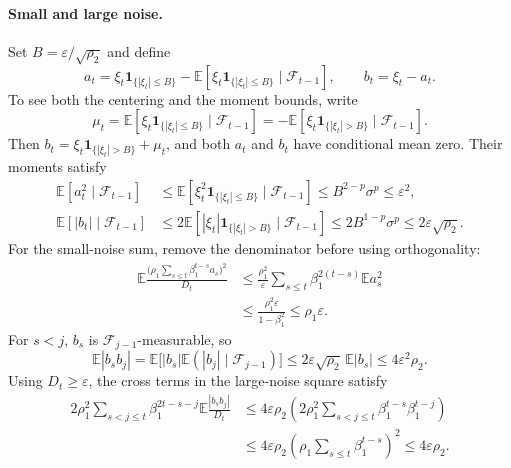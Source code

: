 \documentclass[11pt,letterpaper]{article}
\theoremstyle{definition}
\newcommand{\E}{\mathbb E}
\newcommand{\F}{\mathcal F}
\newcommand{\eps}{\varepsilon}
\begin{document}
\paragraph{Small and large noise.}
Set $B=\eps/\sqrt{\rho_2}$ and define
\[
a_t=\xi_t\mathbf1_{\{|\xi_t|\le B\}}
-\E[\xi_t\mathbf1_{\{|\xi_t|\le B\}}\mid\F_{t-1}],
\qquad b_t=\xi_t-a_t.
\]
To see both the centering and the moment bounds, write
\[
\mu_t=\E[\xi_t\mathbf1_{\{|\xi_t|\le B\}}\mid\F_{t-1}]
=-\E[\xi_t\mathbf1_{\{|\xi_t|>B\}}\mid\F_{t-1}].
\]
Then $b_t=\xi_t\mathbf1_{\{|\xi_t|>B\}}+\mu_t$, and both
$a_t$ and $b_t$ have conditional mean zero. Their moments satisfy
\begin{align}
\E[a_t^2\mid\F_{t-1}]
&\le\E[\xi_t^2\mathbf1_{\{|\xi_t|\le B\}}\mid\F_{t-1}]
\le B^{2-p}\sigma^p\le\eps^2,\nonumber\\
\E[|b_t|\mid\F_{t-1}]
&\le2\E[|\xi_t|\mathbf1_{\{|\xi_t|>B\}}\mid\F_{t-1}]
\le2B^{1-p}\sigma^p\le2\eps\sqrt{\rho_2}.
\label{eq:split-noise-moments}
\end{align}
For the small-noise sum, remove the denominator before using
orthogonality:
\begin{align*}
\E\frac{\bigl(\rho_1\sum_{s\le t}\beta_1^{t-s}a_s\bigr)^2}{D_t}
&\le\frac{\rho_1^2}{\eps}
\sum_{s\le t}\beta_1^{2(t-s)}\E a_s^2\\
&\le\frac{\rho_1^2\eps}{1-\beta_1^2}
\le\rho_1\eps.
\end{align*}
For $s<j$, $b_s$ is $\F_{j-1}$-measurable, so
\[
\E|b_sb_j|
 =\E\bigl[|b_s|\E(|b_j|\mid\F_{j-1})\bigr]
\le2\eps\sqrt{\rho_2}\,\E|b_s|
\le4\eps^2\rho_2.
\]
Using $D_t\ge\eps$, the cross terms in the large-noise square satisfy
\begin{equation}
\begin{aligned}
2\rho_1^2\sum_{s<j\le t}\beta_1^{2t-s-j}
\E\frac{|b_sb_j|}{D_t}
&\le4\eps\rho_2\left(2\rho_1^2
\sum_{s<j\le t}\beta_1^{t-s}\beta_1^{t-j}\right)\\
&\le4\eps\rho_2
\left(\rho_1\sum_{s\le t}\beta_1^{t-s}\right)^2
\le4\eps\rho_2.
\end{aligned}
\label{eq:large-noise-cross}
\end{equation}
\end{document}
